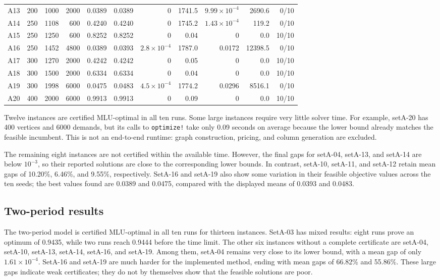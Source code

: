\begin{table}[h!]
\begin{tabular}{@{}lrrrrrrrrrr@{}}
A13 & 200 & 1000 & 2000 & 0.0389 & 0.0389 & 0 & 1741.5 & $9.99\times10^{-4}$ & 2690.6 & 0/10 \\
A14 & 250 & 1108 & 600 & 0.4240 & 0.4240 & 0 & 1745.2 & $1.43\times10^{-4}$ & 119.2 & 0/10 \\
A15 & 250 & 1250 & 600 & 0.8252 & 0.8252 & 0 & 0.04 & 0 & 0.0 & 10/10 \\
A16 & 250 & 1452 & 4800 & 0.0389 & 0.0393 & $2.8\times10^{-4}$ & 1787.0 & 0.0172 & 12398.5 & 0/10 \\
A17 & 300 & 1270 & 2000 & 0.4242 & 0.4242 & 0 & 0.05 & 0 & 0.0 & 10/10 \\
A18 & 300 & 1500 & 2000 & 0.6334 & 0.6334 & 0 & 0.04 & 0 & 0.0 & 10/10 \\
A19 & 300 & 1998 & 6000 & 0.0475 & 0.0483 & $4.5\times10^{-4}$ & 1774.2 & 0.0296 & 8516.1 & 0/10 \\
A20 & 400 & 2000 & 6000 & 0.9913 & 0.9913 & 0 & 0.09 & 0 & 0.0 & 10/10 \\
\bottomrule
\end{tabular}
\end{table}

Twelve instances are certified MLU-optimal in all ten runs. Some large instances require very little
solver time. For example, setA-20 has 400 vertices and 6000 demands, but its calls to
\texttt{optimize!} take only 0.09 seconds on average because the lower bound already matches the
feasible incumbent. This is not an end-to-end runtime: graph construction, pricing, and column
generation are excluded.

The remaining eight instances are not certified within the available time. However, the final gaps
for setA-04, setA-13, and setA-14 are below $10^{-3}$, so their reported solutions are close to the
corresponding lower bounds. In contrast, setA-10, setA-11, and setA-12 retain mean gaps of 10.20\%,
6.46\%, and 9.55\%, respectively. SetA-16 and setA-19 also show some variation in their feasible
objective values across the ten seeds; the best values found are 0.0389 and 0.0475, compared with the
displayed means of 0.0393 and 0.0483.

\subsection{Two-period results}

The two-period model is certified MLU-optimal in all ten runs for thirteen instances. SetA-03 has mixed
results: eight runs prove an optimum of 0.9435, while two runs reach 0.9444 before the time limit. The
other six instances without a complete certificate are setA-04, setA-10, setA-13, setA-14, setA-16,
and setA-19. Among them, setA-04 remains very close to its lower bound, with a mean gap of only
$1.61\times10^{-4}$. SetA-16 and setA-19 are much harder for the implemented method, ending with mean
gaps of 66.82\% and 55.86\%. These large gaps indicate weak certificates; they do not by themselves
show that the feasible solutions are poor.

